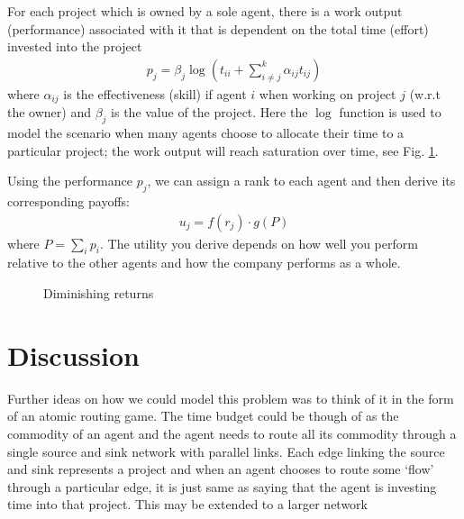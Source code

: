 \documentclass[11pt, a4paper]{article}
\begin{document}
For each project which is owned by a sole agent, there is a work output (performance) associated with it that is dependent on the total time (effort) invested into the project
\begin{align*}
p_j = \beta_j\log\left(t_{ii}+\sum_{i\neq j}^{k}\alpha_{ij}t_{ij}\right)
\end{align*}
where $\alpha_{ij}$ is the effectiveness (skill) if agent $i$ when working on project $j$ (w.r.t the owner) and $\beta_{j}$ is the value of the project. Here the $\log$ function is used to model the scenario when many agents choose to allocate their time to a particular project;  the work output will reach saturation over time, see Fig. \ref{fig:log}.


Using the performance $p_j$, we can assign a rank to each agent and then derive its corresponding payoffs:
\begin{align*}
u_j=f(r_j)\cdot g(P)
\end{align*}
where $P=\sum_{i}p_i$. The utility you derive depends on how well you perform relative to the other agents and how the company performs as a whole. 


\begin{figure}
\centering
{}
\caption{Diminishing returns}\label{fig:log}
\end{figure}


\section{Discussion}
Further ideas on how we could model this problem was to think of it in the form of an atomic routing game. The time budget could be though of as the commodity of an agent and the agent needs to route all its commodity through a single source and sink network with parallel links. Each edge linking the source and sink represents a project and when an agent chooses to route some `flow' through a particular edge, it is just same as saying that the agent is investing time into that project. This may be extended to a larger network 
\end{document}
